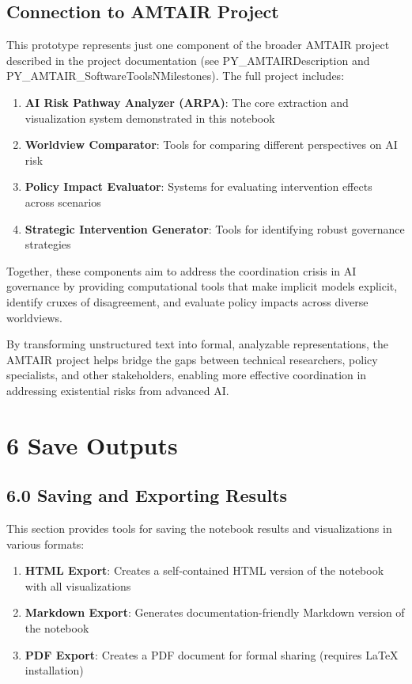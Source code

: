 \documentclass[
  11pt,
  letterpaper,
]{book}
\providecommand{\tightlist}{%
  \setlength{\itemsep}{0pt}\setlength{\parskip}{0pt}}
\begin{document}
\section{Connection to AMTAIR
Project}\label{connection-to-amtair-project}

This prototype represents just one component of the broader AMTAIR
project described in the project documentation (see
PY\_AMTAIRDescription and PY\_AMTAIR\_SoftwareToolsNMilestones). The
full project includes:

\begin{enumerate}
\def\labelenumi{\arabic{enumi}.}
\tightlist
\item
  \textbf{AI Risk Pathway Analyzer (ARPA)}: The core extraction and
  visualization system demonstrated in this notebook
\item
  \textbf{Worldview Comparator}: Tools for comparing different
  perspectives on AI risk
\item
  \textbf{Policy Impact Evaluator}: Systems for evaluating intervention
  effects across scenarios
\item
  \textbf{Strategic Intervention Generator}: Tools for identifying
  robust governance strategies
\end{enumerate}

Together, these components aim to address the coordination crisis in AI
governance by providing computational tools that make implicit models
explicit, identify cruxes of disagreement, and evaluate policy impacts
across diverse worldviews.

By transforming unstructured text into formal, analyzable
representations, the AMTAIR project helps bridge the gaps between
technical researchers, policy specialists, and other stakeholders,
enabling more effective coordination in addressing existential risks
from advanced AI.

\chapter{6 Save Outputs}\label{save-outputs}

\section{6.0 Saving and Exporting
Results}\label{saving-and-exporting-results}

This section provides tools for saving the notebook results and
visualizations in various formats:

\begin{enumerate}
\def\labelenumi{\arabic{enumi}.}
\tightlist
\item
  \textbf{HTML Export}: Creates a self-contained HTML version of the
  notebook with all visualizations
\item
  \textbf{Markdown Export}: Generates documentation-friendly Markdown
  version of the notebook
\item
  \textbf{PDF Export}: Creates a PDF document for formal sharing
  (requires LaTeX installation)
\end{enumerate}
\end{document}
